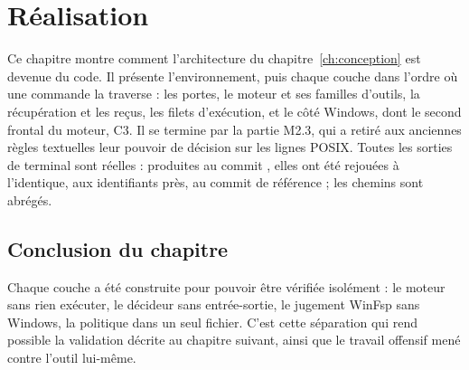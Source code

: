 \chapter{Réalisation}
\label{ch:realisation}

Ce chapitre montre comment l'architecture du chapitre~\ref{ch:conception} est devenue du
code. Il présente l'environnement, puis chaque couche dans l'ordre où une commande la
traverse : les portes, le moteur et ses familles d'outils, la récupération et les reçus, les
filets d'exécution, et le côté Windows, dont le second frontal du moteur, C3. Il se termine
par la partie M2.3, qui a retiré aux anciennes règles textuelles leur pouvoir de décision
sur les lignes POSIX. Toutes les sorties de terminal sont réelles : produites au commit , elles ont été
rejouées à l'identique, aux identifiants près, au commit de référence \commitref{} ; les chemins
sont abrégés.









\section*{Conclusion du chapitre}
Chaque couche a été construite pour pouvoir être vérifiée isolément : le moteur sans rien
exécuter, le décideur sans entrée-sortie, le jugement WinFsp sans Windows, la politique dans
un seul fichier. C'est cette séparation qui rend possible la validation décrite au chapitre
suivant, ainsi que le travail offensif mené contre l'outil lui-même.
